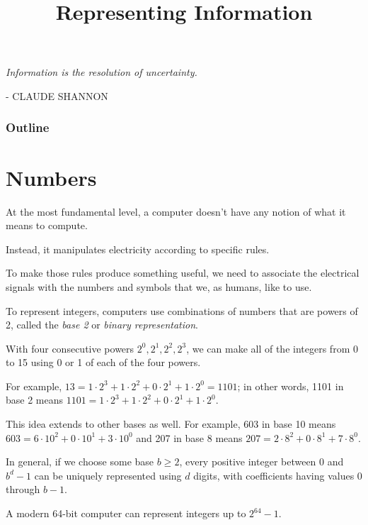 \documentclass[8pt,a4paper,compress,handout]{beamer}
\title{Representing Information}
\date{}
\begin{document}
\begin{frame}
\hfill
\begin{minipage}{150pt}
\begin{flushright}
\tiny \emph{Information is the resolution of uncertainty.} 

\smallskip

- CLAUDE SHANNON
\end{flushright}
\end{minipage}
\vfill
\titlepage
\end{frame}

\begin{frame}
\frametitle{Outline}
\tableofcontents
\end{frame}

\section{Numbers}
\begin{frame}[fragile]
At the most fundamental level, a computer doesn't have any notion of what it means to compute. 

\bigskip

Instead, it manipulates electricity according to specific rules.

\bigskip

To make those rules produce something useful, we need to associate the electrical signals with the numbers and symbols that we, as humans, like to use.
\end{frame}

\begin{frame}[fragile]
To represent integers, computers use combinations of numbers that are powers of 2, called the \emph{base 2} or \emph{binary representation}.

\bigskip

With four consecutive powers $2^0, 2^1, 2^2, 2^3$, we can make all of the integers from 0 to 15 using 0 or 1 of each of the four powers. 

\bigskip

For example, $13 = 1 \cdot 2^3 + 1 \cdot 2^2 + 0 \cdot 2^1 + 1 \cdot 2^0 = 1101$; in other words, 1101 in base 2 means $1101 = 1 \cdot 2^3 + 1 \cdot 2^2 + 0 \cdot 2^1 + 1 \cdot 2^0$.

\bigskip

This idea extends to other bases as well. For example, 603 in base 10 means $603 = 6 \cdot 10^2 + 0 \cdot 10^1 + 3 \cdot 10^0$ and 207 in base 8 means $207 = 2 \cdot 8^2 + 0 \cdot 8^1 + 7 \cdot 8^0$. 

\bigskip

In general, if we choose some base $b \geq 2$, every positive integer between 0 and $b^d-1$ can be uniquely represented using $d$ digits, with coefficients having values 0 through $b-1$.

\bigskip

A modern 64-bit computer can represent integers up to $2^{64} - 1$.
\end{frame}
\end{document}

